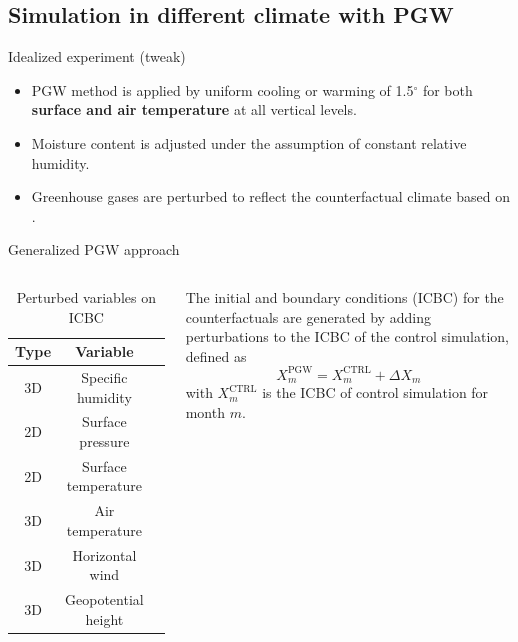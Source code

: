 \documentclass[
11pt,notheorems,hyperref={pdfauthor=whatever}
]{beamer}
\begin{document}
\subsection{Simulation in different climate with PGW}

\begin{frame}
    \begin{block}{Idealized experiment (tweak)}
        \begin{itemize}
            \item PGW method is applied by uniform cooling or warming of 1.5$^\circ$ for both \textbf{surface and air temperature} at all vertical levels.
            \item Moisture content is adjusted under the assumption of constant relative humidity.
            \item Greenhouse gases are perturbed to reflect the counterfactual climate based on \citet{meinshausen2017historical,meinshausen2020ssp}.
        \end{itemize}
         
    \end{block} \pause

    \begin{block}{Generalized PGW approach}
        \begin{columns}[T,onlytextwidth]
        \begin{table}[h] 
            \centering
            \begin{tabular}{ccc} 
            \hline
            \textbf{Type} & \textbf{Variable} \\
            \hline
            3D	&Specific humidity \\
            2D	&Surface pressure \\
            2D	&Surface temperature \\
            3D	&Air temperature \\
            3D	&Horizontal wind \\
            3D	&Geopotential height \\
            \hline
            \end{tabular}
            \caption*{Perturbed variables on ICBC}
            \label{table:cmip6_vars}
        \end{table}

            The initial and boundary conditions (ICBC) for the counterfactuals are generated by adding perturbations to the ICBC of the control simulation, defined as
            \begin{equation*}
                X^{\text{PGW}}_m = X^{\text{CTRL}}_m + \Delta X_m
            \end{equation*}
            with $X^{\text{CTRL}}_m$ is the ICBC of control simulation for month $m$.
        \end{columns}
    \end{block}
\end{frame}
\end{document}
